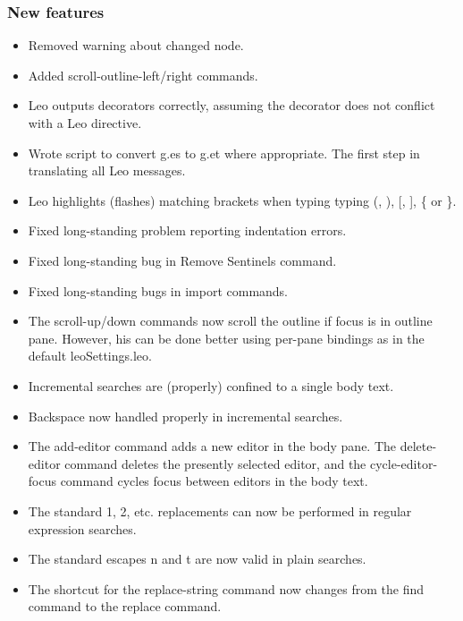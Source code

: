 \documentclass[a4paper,10pt,english]{sphinxmanual}
\begin{document}
\subsubsection{New features}
\label{what-is-new:id23}\begin{itemize}
\item {} 
Removed warning about changed node.

\item {} 
Added scroll-outline-left/right commands.

\item {} 
Leo outputs decorators correctly, assuming the decorator does not conflict with a Leo directive.

\item {} 
Wrote script to convert g.es to g.et where appropriate.
The first step in translating all Leo messages.

\item {} 
Leo highlights (flashes) matching brackets when typing typing (, ), {[}, {]}, \{ or \}.

\item {} 
Fixed long-standing problem reporting indentation errors.

\item {} 
Fixed long-standing bug in Remove Sentinels command.

\item {} 
Fixed long-standing bugs in import commands.

\item {} 
The scroll-up/down commands now scroll the outline if focus is in outline pane.
However, his can be done better using per-pane bindings as in the default leoSettings.leo.

\item {} 
Incremental searches are (properly) confined to a single body text.

\item {} 
Backspace now handled properly in incremental searches.

\item {} 
The add-editor command adds a new editor in the body pane.
The delete-editor command deletes the presently selected editor,
and the cycle-editor-focus command cycles focus between editors in the body text.

\item {} 
The standard 1, 2, etc. replacements can now be performed in regular expression searches.

\item {} 
The standard escapes n and t are now valid in plain searches.

\item {} 
The shortcut for the replace-string command now changes from the find command
to the replace command.

\end{itemize}
\end{document}
